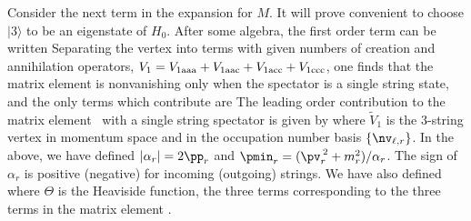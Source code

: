 Consider the next term in the expansion for $M$.  It will prove
convenient to choose $|3\rangle$ to be an eigenstate of $H_0$.
After some algebra, the first order term can be written
\eqn{}
Separating the vertex into terms with given numbers of creation and
annihilation operators, $V_1 = V_{1\rm aaa} + V_{1\rm aac} + V_{1\rm
acc}
+ V_{1\rm ccc}$, one finds that the matrix element is
nonvanishing only when the spectator is a single string state,
\eqn{}
and the only terms which contribute are
\eqn{}
The leading order contribution
to the matrix element \Minty\ with a single string spectator is
given by
\eqn{}
where ${\tilde V}_1$ is the 3-string vertex in momentum space
and in the occupation number basis $\{ \nv_{\ell, r} \}$.
In the above, we have defined $| \alpha_r | = 2\pp_r$ and $\pmin_r =
(\pv_r^{\> 2} + m^2_r ) / \alpha_r$.  The sign of $\alpha_r$ is
positive (negative) for incoming (outgoing) strings.  We have also
defined
\eqn{}
where $\Theta$ is the
Heaviside function, the three terms corresponding to the three terms
in the matrix element \ancre.

